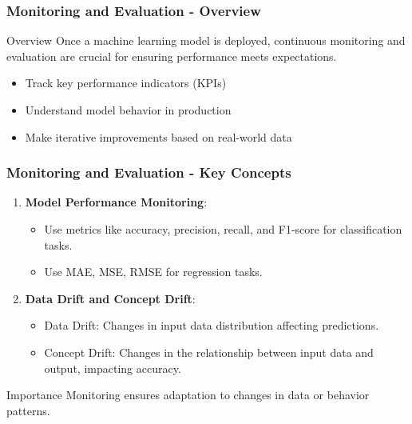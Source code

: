 \documentclass[aspectratio=169]{beamer}
\begin{document}
\begin{frame}[fragile]
    \frametitle{Monitoring and Evaluation - Overview}
    \begin{block}{Overview}
        Once a machine learning model is deployed, continuous monitoring and evaluation are crucial for ensuring performance meets expectations.
    \end{block}
    \begin{itemize}
        \item Track key performance indicators (KPIs)
        \item Understand model behavior in production
        \item Make iterative improvements based on real-world data
    \end{itemize}
\end{frame}

\begin{frame}[fragile]
    \frametitle{Monitoring and Evaluation - Key Concepts}
    \begin{enumerate}
        \item \textbf{Model Performance Monitoring}:
        \begin{itemize}
            \item Use metrics like accuracy, precision, recall, and F1-score for classification tasks.
            \item Use MAE, MSE, RMSE for regression tasks.
        \end{itemize}

        \item \textbf{Data Drift and Concept Drift}:
        \begin{itemize}
            \item Data Drift: Changes in input data distribution affecting predictions.
            \item Concept Drift: Changes in the relationship between input data and output, impacting accuracy.
        \end{itemize}
    \end{enumerate}
    \begin{block}{Importance}
        Monitoring ensures adaptation to changes in data or behavior patterns.
    \end{block}
\end{frame}
\end{document}
